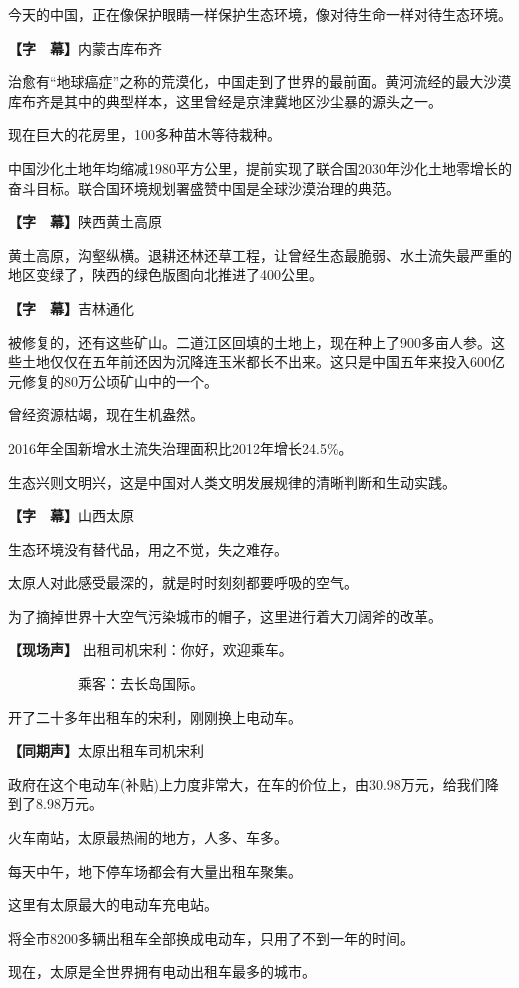 \documentclass{ctexart}
\newcommand{\zkh}[1]{\textbf{\hspace{-2.7em} 【#1】}}
\begin{document}
 今天的中国，正在像保护眼睛一样保护生态环境，像对待生命一样对待生态环境。

 \zkh{字　幕}内蒙古库布齐

 
治愈有``地球癌症''之称的荒漠化，中国走到了世界的最前面。黄河流经的最大沙漠库布齐是其中的典型样本，这里曾经是京津冀地区沙尘暴的源头之一。

 现在巨大的花房里，100多种苗木等待栽种。

中国沙化土地年均缩减1980平方公里，提前实现了联合国2030年沙化土地零增长的奋斗目标。联合国环境规划署盛赞中国是全球沙漠治理的典范。

 \zkh{字　幕}陕西黄土高原

 
黄土高原，沟壑纵横。退耕还林还草工程，让曾经生态最脆弱、水土流失最严重的地区变绿了，陕西的绿色版图向北推进了400公里。

 \zkh{字　幕}吉林通化

 
被修复的，还有这些矿山。二道江区回填的土地上，现在种上了900多亩人参。这些土地仅仅在五年前还因为沉降连玉米都长不出来。这只是中国五年来投入600亿元修复的80万公顷矿山中的一个。

 曾经资源枯竭，现在生机盎然。

 2016年全国新增水土流失治理面积比2012年增长24.5{\%}。

 生态兴则文明兴，这是中国对人类文明发展规律的清晰判断和生动实践。

 \zkh{字　幕}山西太原

 生态环境没有替代品，用之不觉，失之难存。

 太原人对此感受最深的，就是时时刻刻都要呼吸的空气。

 为了摘掉世界十大空气污染城市的帽子，这里进行着大刀阔斧的改革。

 \zkh{现场声} 出租司机宋利：你好，欢迎乘车。

  　　　　　乘客：去长岛国际。

 开了二十多年出租车的宋利，刚刚换上电动车。

 \zkh{同期声}太原出租车司机宋利

政府在这个电动车(补贴)上力度非常大，在车的价位上，由30.98万元，给我们降到了8.98万元。

 火车南站，太原最热闹的地方，人多、车多。

 每天中午，地下停车场都会有大量出租车聚集。

 这里有太原最大的电动车充电站。

 将全市8200多辆出租车全部换成电动车，只用了不到一年的时间。

 现在，太原是全世界拥有电动出租车最多的城市。
\end{document}
